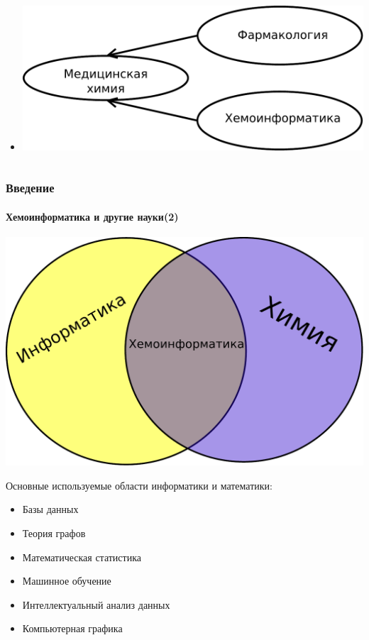 \begin{frame}
\begin{columns}
\begin{column}{0.5\textwidth}
\begin{itemize}
      \item \includegraphics[scale=0.29]{images/Diagram4.pdf}
      \end{itemize}
    \end{column}
  \end{columns}
\end{frame}

\begin{frame}
  \frametitle{Введение}
  \framesubtitle{Хемоинформатика и другие науки(2)}

  \begin{center}
    \includegraphics[scale=0.3]{images/Diagram5.pdf}
  \end{center}

  Основные используемые области информатики и математики:
  \begin{itemize}
    \item Базы данных
    \item Теория графов
    \item Математическая статистика
    \item Машинное обучение
    \item Интеллектуальный анализ данных
    \item Компьютерная графика
  \end{itemize}
\end{frame}

